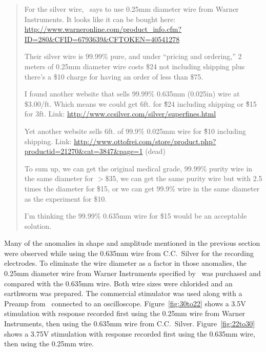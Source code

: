 \begin{quotation}
For the silver wire,~\cite{KuehJellies} says to use 0.25mm diameter wire from Warner Instruments.  It looks like it can be bought here:  \url{http://www.warneronline.com/product_info.cfm?ID=280&CFID=6793639&CFTOKEN=40541278}

Their silver wire is 99.99\% pure, and under ``pricing and ordering,'' 2 meters of 0.25mm diameter wire costs \$24 not including shipping plus there's a \$10 charge for having an order of less than \$75.

I found another website that sells 99.99\% 0.635mm (0.025in) wire at \$3.00/ft.  Which means we could get 6ft. for \~\$24 including shipping or \~\$15 for 3ft.  Link: \url{http://www.ccsilver.com/silver/superfines.html}

Yet another website sells 6ft. of 99.9\% 0.025mm wire for \~\$10 including shipping.  Link: \url{http://www.ottofrei.com/store/product.php?productid=21270&cat=3847&page=1} (dead)

To sum up, we can get the original medical grade, 99.99\% purity wire in the same diameter for $>$\$35, we can get the same purity wire but with 2.5 times the diameter for \$15, or we can get 99.9\% wire in the same diameter as the experiment for \$10.

I'm thinking the 99.99\% 0.635mm wire for \$15 would be an acceptable solution.
\end{quotation}

Many of the anomalies in shape and amplitude mentioned in the previous section were observed while using the 0.635mm wire from C.C.~Silver for the recording electrodes.  To eliminate the wire diameter as a factor in those anomalies, the 0.25mm diameter wire from Warner Instruments specified by~\cite{KuehJellies} was purchased and compared with the 0.635mm wire.  Both wire sizes were chlorided and an earthworm was prepared.  The commercial stimulator was used along with a Preamp from~\cite{BatzerCorsiCrampton} connected to an oscilloscope.  Figure~\ref{fig:30to22} shows a 3.5V stimulation with response recorded first using the 0.25mm wire from Warner Instruments, then using the 0.635mm wire from C.C.~Silver.  Figure~\ref{fig:22to30} shows a 3.75V stimulation with response recorded first using the 0.635mm wire, then using the 0.25mm wire.


